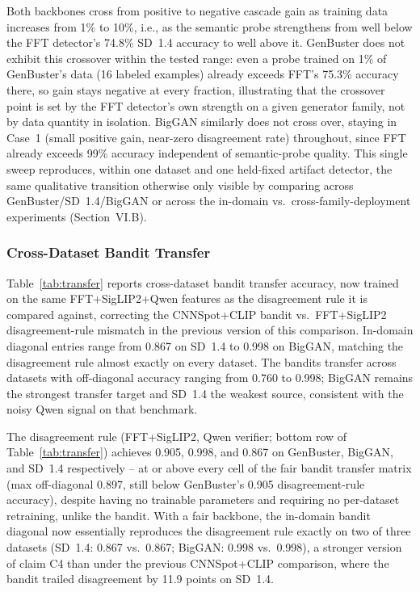 \documentclass{ieeeaccess}
\begin{document}
Both backbones cross from positive to negative cascade gain as training data increases
from 1\% to 10\%, i.e., as the semantic probe strengthens from well below the FFT
detector's 74.8\% SD~1.4 accuracy to well above it. GenBuster does not exhibit this
crossover within the tested range: even a probe trained on 1\% of GenBuster's data (16
labeled examples) already exceeds FFT's 75.3\% accuracy there, so gain stays negative at
every fraction, illustrating that the crossover point is set by the FFT detector's own
strength on a given generator family, not by data quantity in isolation. BigGAN similarly
does not cross over, staying in Case~1 (small positive gain, near-zero disagreement rate)
throughout, since FFT already exceeds 99\% accuracy independent of semantic-probe
quality. This single sweep reproduces, within one dataset and one held-fixed artifact
detector, the same qualitative transition otherwise only visible by comparing across
GenBuster/SD~1.4/BigGAN or across the in-domain vs.\ cross-family-deployment
experiments (Section~VI.B).

\subsubsection{Cross-Dataset Bandit Transfer}

Table~\ref{tab:transfer} reports cross-dataset bandit transfer accuracy, now trained on
the same FFT+SigLIP2+Qwen features as the disagreement rule it is compared against,
correcting the CNNSpot+CLIP bandit vs.\
FFT+SigLIP2 disagreement-rule mismatch in the previous version of this comparison.
In-domain diagonal entries range from 0.867 on SD~1.4 to 0.998 on BigGAN, matching the
disagreement rule almost exactly on every dataset. The bandits transfer across datasets
with off-diagonal accuracy ranging from 0.760 to 0.998; BigGAN remains the strongest
transfer target and SD~1.4 the weakest source, consistent with the noisy Qwen signal on
that benchmark.

The disagreement rule (FFT+SigLIP2, Qwen verifier; bottom row of
Table~\ref{tab:transfer}) achieves 0.905, 0.998, and 0.867 on GenBuster, BigGAN, and
SD~1.4 respectively -- at or above every cell of the fair bandit transfer matrix (max
off-diagonal 0.897, still below GenBuster's 0.905 disagreement-rule accuracy), despite
having no trainable parameters and requiring no per-dataset retraining, unlike the
bandit. With a fair backbone, the in-domain bandit diagonal now essentially reproduces
the disagreement rule exactly on two of three datasets (SD~1.4: 0.867 vs.\ 0.867;
BigGAN: 0.998 vs.\ 0.998), a stronger version of claim C4 than under the previous
CNNSpot+CLIP comparison, where the bandit trailed disagreement by 11.9 points on
SD~1.4.
\end{document}

